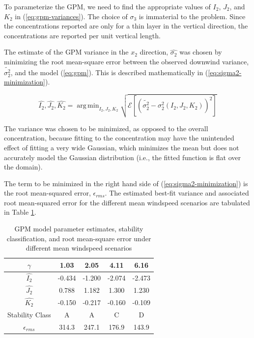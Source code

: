 \documentclass[]{aiaa-tc}%
\newcommand{\eqnref}[1]{(\ref{#1})}
\DeclareMathOperator*{\argmin}{arg\,min}
\begin{document}
To parameterize the GPM, we need to find the appropriate values of $I_2$, $J_2$, and $K_2$ in \eqnref{eq:gpm-variances}. The choice of $\sigma_3$ is immaterial to the problem. Since the concentrations reported are only for a thin layer in the vertical direction, the concentrations are reported per unit vertical length.

The estimate of the GPM variance in the $x_2$ direction, $\widehat{\sigma_2}$ was chosen by minimizing the root mean-square error between the observed downwind variance, $\tilde{\sigma_2^2}$, and the model \eqnref{eq:gpm}. This is described mathematically in \eqnref{eq:sigma2-minimization}.

\begin{equation} \label{eq:sigma2-minimization}
  \hat{I_2}, \hat{J_2}, \hat{K_2} = \argmin_{I_2, J_2, K_2} \sqrt{\mathcal{E} \left[\left(\tilde{\sigma_2^2} -  \sigma_2^2(I_2, J_2, K_2) \right)^2 \right]}
\end{equation}

The variance was chosen to be minimized, as opposed to the overall concentration, because fitting to the concentration may have the unintended effect of fitting a very wide Gaussian, which minimizes the mean but does not accurately model the Gaussian distribution (i.e., the fitted function is flat over the domain).

The term to be minimized in the right hand side of \eqnref{eq:sigma2-minimization} is the root mean-squared error, $\epsilon_{rms}$. The estimated best-fit variance and associated root mean-squared error for the different mean windspeed scenarios are tabulated in Table \ref{tbl:parameter-choice}.

\begin{table}
  \centering
  \caption{GPM model parameter estimates, stability classification, and root mean-square error under different mean windspeed scenarios}
  \label{tbl:parameter-choice}
  \begin{tabular}{c c c c c}
    \hline
    $\gamma$ & 1.03 & 2.05 & 4.11 & 6.16 \\
    \hline \hline
    $\widehat{I_2}$ & -0.434 & -1.200 & -2.074 & -2.473 \\
    \hline
    $\widehat{J_2}$ & 0.788 & 1.182 & 1.300 & 1.230 \\
    \hline
    $\widehat{K_2}$ & -0.150 & -0.217 & -0.160 & -0.109 \\
    \hline
    Stability Class & A & A & C & D \\
    \hline
    $\epsilon_{rms}$ & 314.3 & 247.1 & 176.9 & 143.9 \\
    \hline
  \end{tabular}
\end{table}
\end{document}
